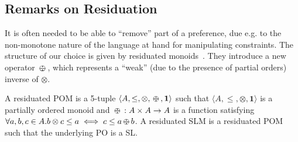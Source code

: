 \documentclass{llncs}
\def\monid{{\mathbf 0}}
\def\monop{\otimes}
\def\odiv{\, {\ominus\hspace{-7.7pt} \div} \,}
\def\monid{\mathbf{1}}
\begin{document}
%
%
%

%
%
%

\subsection{Remarks on Residuation}\label{sec:ror}
It is often needed to be able to ``remove'' part of a preference, due e.g. 
to the non-monotone nature of the language at hand
for manipulating constraints. 
%
The structure of our choice is given by residuated monoids~\cite{golanShort}. 
%
They introduce a new operator $\odiv$, which represents a ``weak'' (due to the presence of partial orders) inverse of $\otimes$.

\begin{definition}[Residuation]\label{def:repo}
	A residuated POM is a 5-tuple $\langle A, \leq, \monop, \odiv, \monid \rangle$ such that
	$\langle A, \leq, \monop, \monid \rangle$ is a partially ordered monoid and
	$\odiv: A \times A \rightarrow A$ is a function satisfying $\forall a, b, c \in A. b \monop c \leq a \iff c \leq a \odiv b$. A residuated SLM is a
	residuated POM such that the underlying PO is a SL.
\end{definition}
\end{document}
